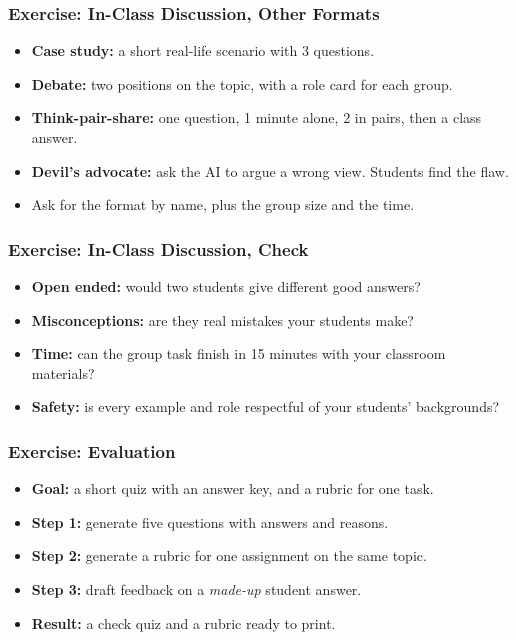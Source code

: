 \begin{frame}[fragile]\frametitle{Exercise: In-Class Discussion, Other Formats}
\begin{itemize}
\item \textbf{Case study:} a short real-life scenario with 3 questions.
\item \textbf{Debate:} two positions on the topic, with a role card for each group.
\item \textbf{Think-pair-share:} one question, 1 minute alone, 2 in pairs, then a class answer.
\item \textbf{Devil's advocate:} ask the AI to argue a wrong view. Students find the flaw.
\item Ask for the format by name, plus the group size and the time.
\end{itemize}
\end{frame}

\begin{frame}[fragile]\frametitle{Exercise: In-Class Discussion, Check}
\begin{itemize}
\item \textbf{Open ended:} would two students give different good answers?
\item \textbf{Misconceptions:} are they real mistakes your students make?
\item \textbf{Time:} can the group task finish in 15 minutes with your classroom materials?
\item \textbf{Safety:} is every example and role respectful of your students' backgrounds?
\end{itemize}
\end{frame}

\begin{frame}[fragile]\frametitle{Exercise: Evaluation}
\begin{itemize}
\item \textbf{Goal:} a short quiz with an answer key, and a rubric for one task.
\item \textbf{Step 1:} generate five questions with answers and reasons.
\item \textbf{Step 2:} generate a rubric for one assignment on the same topic.
\item \textbf{Step 3:} draft feedback on a \emph{made-up} student answer.
\item \textbf{Result:} a check quiz and a rubric ready to print.
\end{itemize}
\end{frame}


